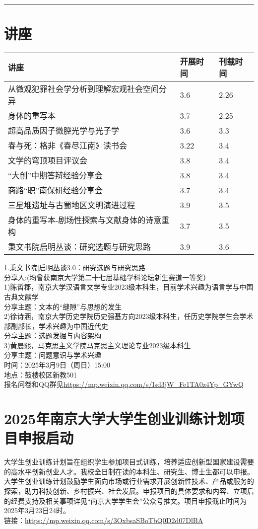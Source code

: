 \documentclass[letterpaper, 12pt]{article}
\begin{document}
\hrule
\pagebreak
\begin{multicols}{2}

\section{讲座}
\begin{tabular}{|>{\centering\arraybackslash}m{}|m{}|m{}|}
    \hline
    讲座 & 开展时间 & 刊载时间\\
    \hline\hline
    从微观犯罪社会学分析到理解宏观社会空间分异   &3.6  &2.26 \\\hline
    身体的重写本 & 3.7 & 2.25\\\hline
    超高品质因子微腔光学与光子学 & 3.6 & 3.3\\\hline
    春与死：格非《春尽江南》读书会 & 3.22 & 3.4\\\hline
    文学的穹顶项目评议会 & 3.8 & 3.4\\\hline
    “大创”中期答辩经验分享会 & 3.8 & 3.4\\\hline
    商路“职”南保研经验分享会 & 3.7 & 3.4\\\hline
    三星堆遗址与古蜀地区文明演进过程 & 3.9 & 3.5\\\hline
    身体的重写本-剧场性探索与文献身体的诗意重构 & 3.7 & 3.5\\\hline
    秉文书院启明丛谈：研究选题与研究思路 & 3.9 & 3.6\\\hline

\end{tabular}
1.秉文书院|启明丛谈3.0：研究选题与研究思路\\
分享人:(均曾获南京大学第二十七届基础学科论坛新生赛道一等奖）\\
1)陈哲郡，南京大学汉语言文学专业2023级本科生，目前学术兴趣为语言学与中国古典文献学\\
分享主题：文本的“缝隙”与思想的发生\\
2)徐诗涵，南京大学历史学院历史强基方向2023级本科生，任历史学院学生会学术部副部长，学术兴趣为中国近代史\\
分享主题：选题发掘与内容架构\\
3)黄晨熙，马克思主义学院马克思主义理论专业2023级本科生\\
分享主题：问题意识与学术兴趣\\
时间：2025年3月9日（周日）15:00\\
地点：鼓楼校区新教501\\
报名问卷和QQ群见\url{https://mp.weixin.qq.com/s/Isd3jW_Fe1TA0z4Yp_GYwQ}

\section{2025年南京大学大学生创业训练计划项目申报启动}
大学生创业训练计划旨在组织学生参加项目式训练，培养适应创新型国家建设需要的高水平创新创业人才。我校全日制在读的本科生、研究生、博士生都可以申报。大学生创业训练计划鼓励学生面向市场或行业需求开展创新性技术、产品或服务的探索，助力科技创新、乡村振兴、社会发展。申报项目的具体要求和内容、立项后的经费支持及相关事项详见“南京大学学生会”公众号推文。项目申报截止时间为2025年3月23日24时。\\
链接：\url{https://mp.weixin.qq.com/s/3OxbsaSBoTbQ0D2d07DlBA}


\end{multicols}
\end{document}
